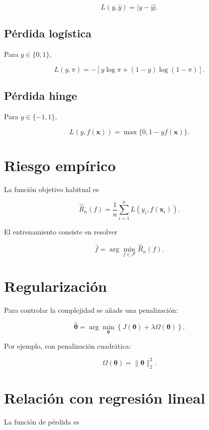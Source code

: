\documentclass[
  spanish,
  11pt,
  letterpaper,
  DIV=11,
  numbers=noendperiod]{scrreprt}
\theoremstyle{definition}
\theoremstyle{plain}
\theoremstyle{definition}
\theoremstyle{remark}
\begin{document}
\[
L(y,\widehat{y})
=
|y-\widehat{y}|.
\]

\subsection{Pérdida logística}\label{puxe9rdida-loguxedstica}

Para \(y\in\{0,1\}\),

\[
L(y,\pi)
=
-
\left[
y\log\pi
+
(1-y)\log(1-\pi)
\right].
\]

\subsection{Pérdida hinge}\label{puxe9rdida-hinge}

Para \(y\in\{-1,1\}\),

\[
L(y,f(\mathbf{x}))
=
\max
\{
0,
1-yf(\mathbf{x})
\}.
\]

\section{Riesgo empírico}\label{riesgo-empuxedrico}

La función objetivo habitual es

\[
\widehat{R}_n(f)
=
\frac{1}{n}
\sum_{i=1}^{n}
L(
y_i,
f(\mathbf{x}_i)
).
\]

El entrenamiento consiste en resolver

\[
\widehat{f}
=
\arg\min_{f\in\mathcal{F}}
\widehat{R}_n(f).
\]

\section{Regularización}\label{regularizaciuxf3n}

Para controlar la complejidad se añade una penalización:

\[
\widehat{\boldsymbol{\theta}}
=
\arg\min_{\boldsymbol{\theta}}
\left\{
J(\boldsymbol{\theta})
+
\lambda
\Omega(\boldsymbol{\theta})
\right\}.
\]

Por ejemplo, con penalización cuadrática:

\[
\Omega(\boldsymbol{\theta})
=
\|\boldsymbol{\theta}\|_2^2.
\]

\section{Relación con regresión
lineal}\label{relaciuxf3n-con-regresiuxf3n-lineal-1}

La función de pérdida es
\end{document}
